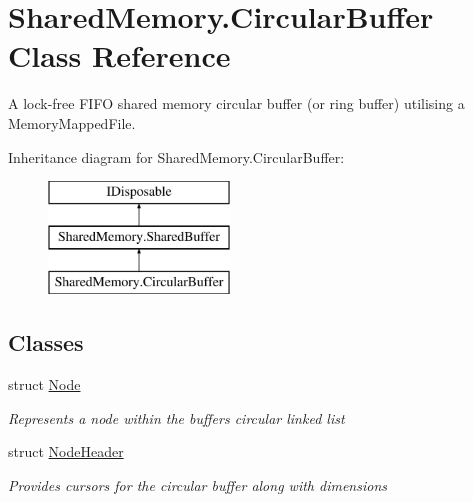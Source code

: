 \hypertarget{class_shared_memory_1_1_circular_buffer}{}\section{Shared\+Memory.\+Circular\+Buffer Class Reference}
\label{class_shared_memory_1_1_circular_buffer}


A lock-\/free F\+I\+FO shared memory circular buffer (or ring buffer) utilising a Memory\+Mapped\+File.  


Inheritance diagram for Shared\+Memory.\+Circular\+Buffer\+:\begin{figure}[H]
\begin{center}
\leavevmode
\includegraphics[height=3.000000cm]{class_shared_memory_1_1_circular_buffer}
\end{center}
\end{figure}
\subsection*{Classes}
\begin{DoxyCompactItemize}
\item 
struct \hyperlink{struct_shared_memory_1_1_circular_buffer_1_1_node}{Node}
\begin{DoxyCompactList}\small\item\em Represents a node within the buffer\textquotesingle{}s circular linked list \end{DoxyCompactList}\item 
struct \hyperlink{struct_shared_memory_1_1_circular_buffer_1_1_node_header}{Node\+Header}
\begin{DoxyCompactList}\small\item\em Provides cursors for the circular buffer along with dimensions \end{DoxyCompactList}\end{DoxyCompactItemize}

